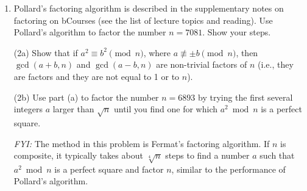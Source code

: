 \documentclass{article}
\begin{document}
\begin{enumerate}
    \item Pollard’s factoring algorithm is described in the supplementary notes on factoring on bCourses (see the list of lecture topics and reading). Use Pollard’s algorithm to factor the number $n = 7081$. Show your steps.

    \item[(2a)] Show that if $a^2 \equiv b^2 \pmod{n}$, where $a \not\equiv \pm b \pmod{n}$, then $\gcd(a+b,n)$ and $\gcd(a-b,n)$ are non-trivial factors of $n$ (i.e., they are factors and they are not equal to 1 or to $n$).

    \item[(2b)] Use part (a) to factor the number $n = 6893$ by trying the first several integers $a$ larger than $\sqrt{n}$ until you find one for which $a^2 \bmod n$ is a perfect square.

    \medskip
    \textit{FYI:} The method in this problem is Fermat’s factoring algorithm. If $n$ is composite, it typically takes about $\sqrt[4]{n}$ steps to find a number $a$ such that $a^2 \bmod n$ is a perfect square and factor $n$, similar to the performance of Pollard’s algorithm.
\end{enumerate}
\end{document}

